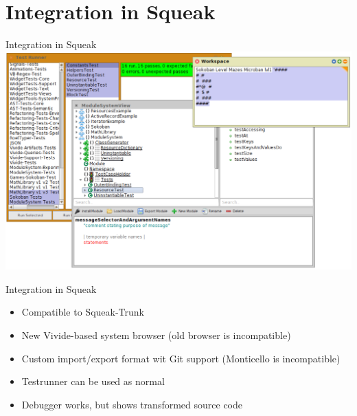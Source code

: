 \documentclass[xcolor=dvipsname, handout]{beamer} %
\newenvironment{explainframe}[1]{
\setboolean{isexplainframe}{true}
\addtocounter{framenumber}{-1}
\setbeamertemplate{background}[grid][step=5mm,color=LightGray]
\begin{frame}[fragile,environment=explainframe]{Handout only: #1}%
}{%
\end{frame}%
\setboolean{isexplainframe}{false}
}
\newenvironment{clearexplainframe}[0]{
\setboolean{isexplainframe}{true}
\addtocounter{framenumber}{-1}
\setbeamertemplate{background}[grid][step=5mm,color=LightGray]
\begin{frame}[fragile,environment=clearexplainframe]%
}{%
\end{frame}%
\setboolean{isexplainframe}{false}
}
\begin{document}



\section{Integration in Squeak}
\begin{frame}{Integration in Squeak}
  \centering
  \includegraphics[width=\textwidth]{screenshot_integration.png}
\end{frame}

\begin{frame}{Integration in Squeak}
\begin{itemize}
  \item Compatible to Squeak-Trunk
  \item New Vivide-based system browser (old browser is incompatible)
  \item Custom import/export format wit Git support (Monticello is incompatible)
  \item Testrunner can be used as normal
  \item Debugger works, but shows transformed source code
\end{itemize}
\end{frame}
\end{document}

